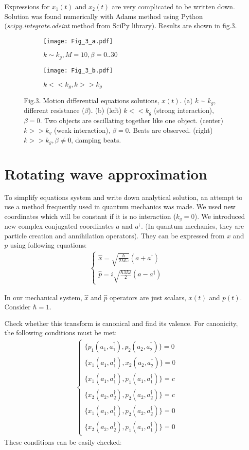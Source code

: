 \documentclass[]{article}
\begin{document}
Expressions for $x_1(t)$ and $x_2(t)$ are very complicated to be written down. Solution was found numerically with Adams method using Python (\textit{scipy.integrate.odeint} method from SciPy library). Results are shown in fig.3.
\begin{figure}
	\begin{subfigure}{0.5\textheight}
		\texttt{[image: Fig\_3\_a.pdf]}
		\caption{$k \sim k_g, M=10, \beta = 0..30$}
	\end{subfigure}
	\begin{subfigure}{0.5\textheight}
		\texttt{[image: Fig\_3\_b.pdf]}
		\caption{$k<<k_g, k>>k_g$}
	\end{subfigure}
	\caption{\centering Fig.3. Motion differential equations solutions, $x(t)$. (a) $k \sim k_g$, different resistance ($\beta$). (b) (left) $k<<k_g$ (strong interaction), $\beta=0$. Two objects are oscillating together like one object. (center) $k>>k_g$ (weak interaction), $\beta=0$. Beats are observed. (right) $k>>k_g, \beta \ne 0$, damping beats.}
\end{figure}
\section{Rotating wave approximation}

To simplify equations system and write down analytical solution, an attempt to use a method frequently used in quantum mechanics was made. We used new coordinates which will be constant if it is no interaction ($k_g=0$).
\newline We introduced new complex conjugated coordinates $a$ and $a^\dag$. (In quantum mechanics, they are particle creation and annihilation operators). They can be expressed from $x$ and $p$ using following equations:
\begin{align*}
	\begin{cases}
		\hat{x} = \sqrt{\frac{\hbar}{2M\omega}}\left(a+a^\dag\right)
		\\
		\hat{p} = i\sqrt{\frac{\hbar M \omega}{2}}\left(a-a^\dag\right)
	\end{cases}	
\end{align*}

In our mechanical system, $\hat{x}$ and $\hat{p}$  operators are just scalars, $x(t)$ and $p(t)$. Consider $\hbar=1$.\newline

Check whether this transform is canonical and find its valence.
For canonicity, the following conditions must be met:
\begin{align*}
	\begin{cases}
		\{p_1(a_1, a^\dag_1), p_2(a_2, a^\dag_2)\}=0
		\\
		\{x_1(a_1, a^\dag_1), x_2(a_2, a^\dag_2)\}=0
		\\
		\{x_1(a_1, a^\dag_1), p_1(a_1, a^\dag_1)\}=c
		\\
		\{x_2(a_2, a^\dag_2), p_2(a_2, a^\dag_2)\}=c
		\\
		\{x_1(a_1, a^\dag_1), p_2(a_2, a^\dag_2)\}=0
		\\
		\{x_2(a_2, a^\dag_2), p_1(a_1, a^\dag_1)\}=0
	\end{cases}
\end{align*}
These conditions can be easily checked:
\end{document}

